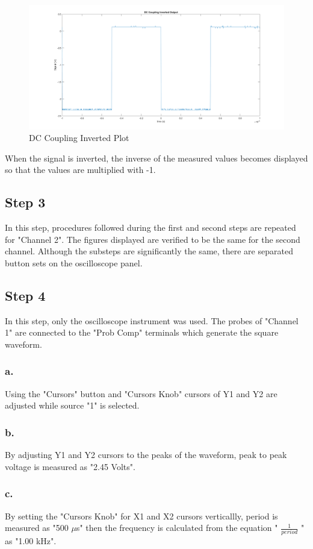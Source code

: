 \documentclass[letterpaper,12pt]{article}
\begin{document}
\begin{figure}[h]
	\caption{DC Coupling Inverted Plot}
	\centering
	\includegraphics[width=1\textwidth]{2b2.png}
\end{figure}
When the signal is inverted, the inverse of the measured values becomes displayed so that the values are multiplied with -1. 

\subsection{Step 3}
In this step, procedures followed during the first and second steps are repeated for "Channel 2". The figures displayed are verified to be the same for the second channel. Although the substeps are significantly the same, there are separated button sets on the oscilloscope panel.
\subsection{Step 4}
In this step, only the oscilloscope instrument was used. The probes of "Channel 1" are connected to the "Prob Comp" terminals which generate the square waveform.
\subsubsection{a.}
Using the "Cursors" button and "Cursors Knob" cursors of Y1 and Y2 are adjusted while source "1" is selected.
\subsubsection{b.}
By adjusting Y1 and Y2 cursors to the peaks of the waveform, peak to peak voltage is measured as "2.45 Volts".
\subsubsection{c.}
By setting the "Cursors Knob" for X1 and X2 cursors verticallly, period is measured as "500 \(\mu\)s" then the frequency is calculated from the equation "  \( \frac{1}{period} \) " as "1.00 kHz".
\end{document}
